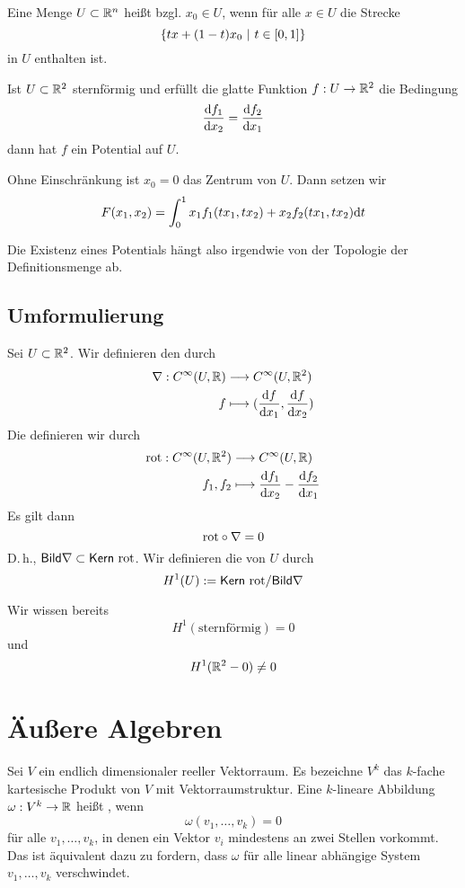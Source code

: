 \Def{}
Eine Menge $U \subset \mathbb{R}^n$ heißt  bzgl. $x_0\in U$, wenn für alle $x \in U$ die Strecke
\[\set{tx + (1-t)x_0}{t\in [0,1]} \]
in $U$ enthalten ist.

\Prop{}
Ist $U \subset \mathbb{R}^2$ sternförmig und erfüllt die glatte Funktion $f : U \overset{}{\rightarrow} \mathbb{R}^2$ die Bedingung
\[ \frac{\text{d} f_1}{\text{d} x_2} = \frac{\text{d} f_2}{\text{d} x_1} \]
dann hat $f$ ein Potential auf $U$.
\begin{Beweis}{}
Ohne Einschränkung ist $x_0 = 0$ das Zentrum von $U$. Dann setzen wir
\[ F(x_1, x_2) = \int^{1}_0 x_1f_1(tx_1, tx_2) + x_2 f_2(tx_1, tx_2) \text{d} t \]
\end{Beweis}

\Bem{}
Die Existenz eines Potentials hängt also irgendwie von der Topologie der Definitionsmenge ab.

\subsection*{Umformulierung}
Sei $U \subset \mathbb{R}^2$. Wir definieren den  durch
\begin{align*}
\nabla : C^\infty(U,\mathbb{R}) & \overset{}{\longrightarrow} C^\infty (U, \mathbb{R}^2)\\
f & \longmapsto (\frac{\text{d} f}{\text{d} x_1}, \frac{\text{d} f}{\text{d} x_2})
\end{align*}
Die  definieren wir durch
\begin{align*}
\text{rot} : C^\infty(U,\mathbb{R}^2) & \overset{}{\longrightarrow} C^\infty (U, \mathbb{R})\\
f_1, f_2 & \longmapsto \frac{\text{d} f_1}{\text{d} x_2} - \frac{\text{d} f_2}{\text{d} x_1}
\end{align*}
Es gilt dann 
\[ \text{rot} \circ \nabla = 0 \]
D.\,h., $\textsf{Bild} \nabla \subset \textsf{Kern}~ \text{rot}$. Wir definieren die  von $U$ durch
\[ H^1(U) := \textsf{Kern}~ \text{rot} / \textsf{Bild} \nabla \]

\Bsp{}
Wir wissen bereits
\[ H^1(\text{sternförmig}) = 0 \]
und
\[ H^1(\mathbb{R}^2 - 0) \neq 0 \]

\section{Äußere Algebren}
Sei $V$ ein endlich dimensionaler reeller Vektorraum. Es bezeichne $V^k$ das $k$-fache kartesische Produkt von $V$ mit Vektorraumstruktur.
\Def{}
Eine $k$-lineare Abbildung $\omega : V^k \overset{}{\rightarrow} \mathbb{R}$ heißt , wenn
\[ \omega(v_1, \ldots, v_k) = 0 \]
für alle $v_1,\ldots, v_k$, in denen ein Vektor $v_i$ mindestens an zwei Stellen vorkommt. Das ist äquivalent dazu zu fordern, dass $\omega$ für alle linear abhängige System $v_1,\ldots, v_k$ verschwindet.

